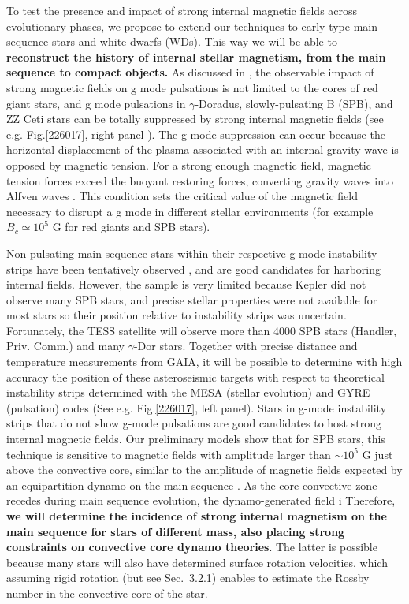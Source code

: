 To test the presence and impact of strong internal magnetic fields across evolutionary phases,
we propose to extend our techniques to early-type main sequence stars and white dwarfs (WDs). This way we will be able to \textbf{reconstruct the history of internal stellar magnetism, from the main sequence to compact objects.} As discussed in \citet{Cantiello_2016}, the observable impact of strong magnetic fields on g mode pulsations is not limited to the cores of red giant stars, and g mode pulsations in $\gamma$-Doradus, slowly-pulsating B (SPB), and ZZ Ceti stars can be totally suppressed by strong internal magnetic fields (see e.g. Fig.\ref{226017}, right panel ). The g mode suppression can occur because the horizontal displacement of the plasma associated with an internal gravity wave is opposed by magnetic tension. For a strong enough magnetic field, magnetic tension forces exceed the buoyant restoring forces, converting gravity waves into Alfven waves \cite{lecoanet:17}. This condition sets the critical value of the magnetic field necessary to disrupt a g mode in different stellar environments (for example $B_c \simeq 10^5$ G for red giants and SPB stars). 

Non-pulsating main sequence stars within their respective g mode instability strips have been tentatively observed \citep{Balona_2011}, and are good candidates for harboring internal fields.
However, the sample is very limited because Kepler did not observe many SPB stars, and precise stellar properties were not available for most stars so their position relative to instability strips was uncertain. Fortunately, the TESS satellite will observe more than 4000 SPB stars (Handler, Priv. Comm.) and many $\gamma$-Dor stars. Together with precise distance and temperature measurements from GAIA, it will be possible to determine with high accuracy the position of these asteroseismic targets with respect to theoretical instability strips determined with the MESA (stellar evolution) and GYRE (pulsation) codes (See e.g. Fig.\ref{226017}, left panel). Stars in g-mode instability strips that do not show g-mode pulsations are good candidates to host strong internal magnetic fields. Our preliminary models show that for SPB stars, this technique is sensitive to magnetic fields with amplitude larger than $\sim \! 10^5$ G just above the convective core, similar to the amplitude of magnetic fields expected by an equipartition dynamo on the main sequence \citep[See e.g.][]{Featherstone_2009,Augustson_2016}. As the core convective zone recedes during main sequence evolution, the dynamo-generated field i Therefore, \textbf{we will determine the incidence of strong internal magnetism on the main sequence for stars of different mass, also placing strong constraints on convective core dynamo theories}. The latter is possible because many stars will also have determined surface rotation velocities, which assuming rigid rotation (but see Sec.~3.2.1) enables to estimate the Rossby number in the convective core of the star.

